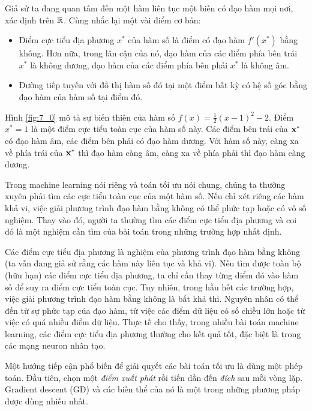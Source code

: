 Giả sử ta đang quan tâm đến một hàm liên tục một biến có đạo hàm mọi nơi, xác
định trên $\mathbb{R}$. Cùng nhắc lại một vài điểm cơ bản:
\begin{itemize}
\item Điểm cực tiểu địa phương $x^*$ của hàm số là điểm có đạo hàm $f'(x^*)$
bằng không. Hơn nữa, trong lân cận của nó, đạo hàm của các điểm phía bên
trái $x^*$ là không dương, đạo hàm của các điểm phía bên phải $x^*$ là không
âm.

\item Đường tiếp tuyến với đồ thị hàm số đó tại một điểm bất kỳ có hệ số góc
bằng đạo hàm của hàm số tại điểm đó.
\end{itemize}

Hình \ref{fig:7_0} mô tả sự biến thiên của hàm số $f(x) = \frac{1}{2}(x - 1)^2 -
2$. Điểm $x^* = 1$ là một điểm cực tiểu toàn cục của hàm số này. Các điểm bên
trái của $\mathbf{x}^*$ có đạo hàm âm, các điểm bên phải có đạo hàm dương. Với
hàm số này, càng xa về phía trái của $\mathbf{x}^*$ thì đạo hàm càng âm, càng xa về
phía phải thì đạo hàm càng dương.


Trong machine learning nói riêng và toán tối ưu nói chung, chúng ta thường xuyên
phải tìm các cực tiểu toàn cục của một hàm số. Nếu chỉ xét riêng các hàm khả vi,
việc giải phương trình đạo hàm bằng không có thể phức tạp hoặc có vô số nghiệm.
Thay vào đó, người ta thường tìm các điểm cực tiểu địa phương và coi đó là một
nghiệm cần tìm của bài toán trong những trường hợp nhất định.

Các điểm cực tiểu địa phương là nghiệm của phương trình đạo hàm bằng không (ta
vẫn đang giả sử rằng các hàm này liên tục và khả vi). Nếu tìm được toàn bộ (hữu
hạn) các điểm cực tiểu địa phương, ta chỉ cần thay từng điểm đó vào hàm số để
suy ra điểm cực tiểu toàn cục. Tuy nhiên, trong hầu hết các trường hợp, việc
giải phương trình đạo hàm bằng không là bất khả thi. Nguyên nhân có thể đến từ
sự phức tạp của đạo hàm, từ việc các điểm dữ liệu có số chiều lớn hoặc từ việc
có quá nhiều điểm dữ liệu. Thực tế cho thấy, trong nhiều bài toán machine
learning, các điểm cực tiểu địa phương thường cho kết quả tốt, đặc biệt là
trong các mạng neuron nhân tạo.

Một hướng tiếp cận phổ biến để giải quyết các bài toán tối ưu là dùng một phép
toán. Đầu tiên, chọn một \textit{điểm xuất phát} rồi tiến dần đến \textit{đích}
sau mỗi vòng lặp. Gradient descent (GD) và các biến thể của nó là một trong
những phương pháp được dùng nhiều nhất.

